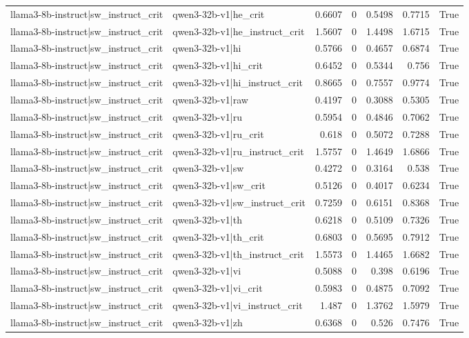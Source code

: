 \begin{table}
\begin{tabular}{l l r r r r l}
llama3-8b-instruct|sw_instruct_crit & qwen3-32b-v1|he_crit & 0.6607 & 0 & 0.5498 & 0.7715 & True \\
llama3-8b-instruct|sw_instruct_crit & qwen3-32b-v1|he_instruct_crit & 1.5607 & 0 & 1.4498 & 1.6715 & True \\
llama3-8b-instruct|sw_instruct_crit & qwen3-32b-v1|hi & 0.5766 & 0 & 0.4657 & 0.6874 & True \\
llama3-8b-instruct|sw_instruct_crit & qwen3-32b-v1|hi_crit & 0.6452 & 0 & 0.5344 & 0.756 & True \\
llama3-8b-instruct|sw_instruct_crit & qwen3-32b-v1|hi_instruct_crit & 0.8665 & 0 & 0.7557 & 0.9774 & True \\
llama3-8b-instruct|sw_instruct_crit & qwen3-32b-v1|raw & 0.4197 & 0 & 0.3088 & 0.5305 & True \\
llama3-8b-instruct|sw_instruct_crit & qwen3-32b-v1|ru & 0.5954 & 0 & 0.4846 & 0.7062 & True \\
llama3-8b-instruct|sw_instruct_crit & qwen3-32b-v1|ru_crit & 0.618 & 0 & 0.5072 & 0.7288 & True \\
llama3-8b-instruct|sw_instruct_crit & qwen3-32b-v1|ru_instruct_crit & 1.5757 & 0 & 1.4649 & 1.6866 & True \\
llama3-8b-instruct|sw_instruct_crit & qwen3-32b-v1|sw & 0.4272 & 0 & 0.3164 & 0.538 & True \\
llama3-8b-instruct|sw_instruct_crit & qwen3-32b-v1|sw_crit & 0.5126 & 0 & 0.4017 & 0.6234 & True \\
llama3-8b-instruct|sw_instruct_crit & qwen3-32b-v1|sw_instruct_crit & 0.7259 & 0 & 0.6151 & 0.8368 & True \\
llama3-8b-instruct|sw_instruct_crit & qwen3-32b-v1|th & 0.6218 & 0 & 0.5109 & 0.7326 & True \\
llama3-8b-instruct|sw_instruct_crit & qwen3-32b-v1|th_crit & 0.6803 & 0 & 0.5695 & 0.7912 & True \\
llama3-8b-instruct|sw_instruct_crit & qwen3-32b-v1|th_instruct_crit & 1.5573 & 0 & 1.4465 & 1.6682 & True \\
llama3-8b-instruct|sw_instruct_crit & qwen3-32b-v1|vi & 0.5088 & 0 & 0.398 & 0.6196 & True \\
llama3-8b-instruct|sw_instruct_crit & qwen3-32b-v1|vi_crit & 0.5983 & 0 & 0.4875 & 0.7092 & True \\
llama3-8b-instruct|sw_instruct_crit & qwen3-32b-v1|vi_instruct_crit & 1.487 & 0 & 1.3762 & 1.5979 & True \\
llama3-8b-instruct|sw_instruct_crit & qwen3-32b-v1|zh & 0.6368 & 0 & 0.526 & 0.7476 & True \\

\end{tabular}
\end{table}
